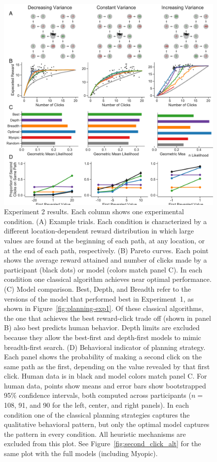 \begin{figure}[p]
  \centering
  \includegraphics[width=\textwidth]{figs/planning/fig4.pdf}
  \caption{Experiment 2 results.
    Each column shows one experimental condition.
    (A) Example trials. Each condition is characterized by a different location-dependent reward distribution in which large values are found at the beginning of each path, at any location, or at the end of each path, respectively.
    (B) Pareto curves. Each point shows the average reward attained and number of clicks made by a participant (black dots) or model (colors match panel C). In each condition one classical algorithm achieves near optimal performance.
    (C) Model comparison. Best, Depth, and Breadth refer to the versions of the model that performed best in Experiment~1, as shown in Figure~\ref{fig:planning-exp1}. Of these classical algorithms, the one that achieves the best reward-click trade off (shown in panel B) also best predicts human behavior. Depth limits are excluded because they allow the best-first and depth-first models to mimic breadth-first search.
    (D) Behavioral indicator of planning strategy. Each panel shows the probability of making a second click on the same path as the first, depending on the value revealed by that first click. Human data is in black and model colors match panel C. For human data, points show means and error bars show bootstrapped 95\% confidence intervals, both computed across participants ($n=$108, 91, and 90 for the left, center, and right panels). In each condition one of the classical planning strategies captures the qualitative behavioral pattern, but only the optimal model captures the pattern in every condition. All heuristic mechanisms are excluded from this plot. See Figure~\ref{fig:second_click_alt} for the same plot with the full models (including Myopic).
  }
  \label{fig:planning-exp2}
\end{figure}



